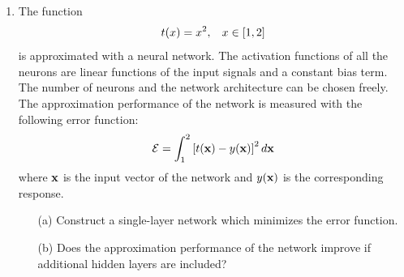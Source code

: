 \begin{enumerate}
\begin{solution}
\begin{enumerate}
      



    \end{enumerate}

  \end{solution}
  
\item The function
  \[
  t(x) = x^2, \hspace{3mm} x \in \left[ 1, 2 \right]
  \]
  is approximated with a neural network. The activation functions of all
  the neurons are linear functions of the input signals and a constant
  bias term. The number of neurons and the network architecture can be
  chosen freely. The approximation performance of the network is
  measured with the following error function:
  \[
  \mathcal{E} = \int_{1}^2 \left[ t({\bf x})-y({\bf x}) \right]^2 d{\bf x}
  \]
  where ${\bf{x}}$ is the input vector of the network and $y({\bf{x}})$ is the
  corresponding response.
  \begin{itemize}
  \item[(a)] Construct a single-layer network which minimizes the error function.
  \item[(b)] Does the approximation performance of the network improve if
    additional hidden layers are included?
  \end{itemize}


\end{enumerate}
